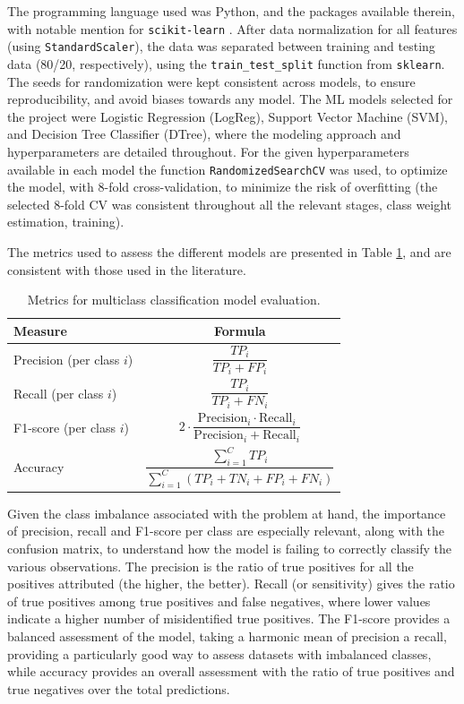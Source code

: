 \documentclass[conference]{IEEEtran}
\begin{document}
The programming language used was Python, and the packages available therein, with notable mention for \texttt{scikit-learn} \cite{scikit-learn}. After data normalization for all features (using \texttt{StandardScaler}), the data was separated between training and testing data (80/20, respectively), using the \texttt{train\_test\_split} function from \texttt{sklearn}. The seeds for randomization were kept consistent across models, to ensure reproducibility, and avoid biases towards any model. 
The ML models selected for the project were Logistic Regression (LogReg), Support Vector Machine (SVM), and Decision Tree Classifier (DTree), where the modeling approach and hyperparameters are detailed throughout. For the given hyperparameters available in each model the function \texttt{RandomizedSearchCV} was used, to optimize the model, with 8-fold cross-validation, to minimize the risk of overfitting (the selected 8-fold CV was consistent throughout all the relevant stages, class weight estimation, training). 

The metrics used to assess the different models are presented in Table \ref{evaluationmetrics}, and are consistent with those used in the literature.

\begin{table}[H]
\centering
\caption{Metrics for multiclass classification model evaluation.}
\label{evaluationmetrics}
\begin{tabular}{lc}
\toprule
\textbf{Measure} & \textbf{Formula} \\
\midrule
Precision (per class $i$) & $\dfrac{TP_i}{TP_i + FP_i}$ \\[1em]
Recall (per class $i$) & $\dfrac{TP_i}{TP_i + FN_i}$ \\[1em]
F1-score (per class $i$) & $2 \cdot \dfrac{\text{Precision}_i \cdot \text{Recall}_i}{\text{Precision}_i + \text{Recall}_i}$ \\[1em] 
Accuracy & $\dfrac{\sum_{i=1}^{C} TP_i}{\sum_{i=1}^{C} (TP_i + TN_i + FP_i + FN_i)}$ \\[1em]
\bottomrule
\end{tabular}
\end{table}

Given the class imbalance associated with the problem at hand, the importance of precision, recall and F1-score per class are especially relevant, along with the confusion matrix, to understand how the model is failing to correctly classify the various observations. The precision is the ratio of true positives for all the positives attributed (the higher, the better). Recall (or sensitivity) gives the ratio of true positives among true positives and false negatives, where lower values indicate a higher number of misidentified true positives. The F1-score provides a balanced assessment of the model, taking a harmonic mean of precision a recall, providing a particularly good way to assess datasets with imbalanced classes, while accuracy provides an overall assessment with the ratio of true positives and true negatives over the total predictions.
\end{document}
